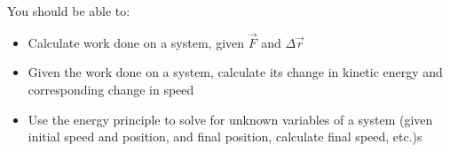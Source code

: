 \documentclass{article}
\begin{document}
	You should be able to:
	\begin{itemize}
		\item Calculate work done on a system, given $\vec{F}$ and $\Delta \vec{r}$
		\item Given the work done on a system, calculate its change in kinetic energy and corresponding change in speed
		\item Use the energy principle to solve for unknown variables of a system (given initial speed and position, and final position, calculate final speed, etc.)s
	\end{itemize}
\end{document}
